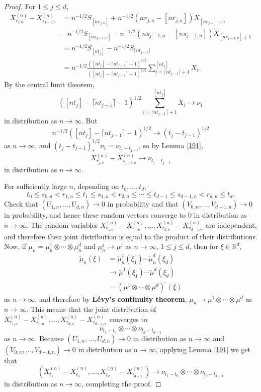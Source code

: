 \documentclass{article}
\theoremstyle{definition}
\begin{document}
\begin{proof}
For $1 \leq j \leq d$, 
\begin{align*}
X^{(n)}_{r_{j,n}} - X^{(n)}_{s_{j-1,n}} &= n^{-1/2} S_{[nr_{j,n}]} + n^{-1/2} (nr_{j,n} - [nr_{j,n}]) X_{[nr_{j,n}]+1}\\
&-n^{-1/2} S_{[ns_{j-1,n}]} - n^{-1/2} (ns_{j-1,n} - [ns_{j-1,n}]) X_{[ns_{j-1,n}]+1}\\
&=n^{-1/2} S_{[nt_j]} - n^{-1/2} S_{\lceil nt_{j-1} \rceil}\\
&=n^{-1/2} \frac{([nt_j] - \lceil nt_{j-1} \rceil - 1)^{1/2}}{([nt_j] - \lceil nt_{j-1} \rceil - 1)^{1/2}} \sum_{i=\lceil nt_{j-1} \rceil+1}^{[nt_j]} X_i.
\end{align*}
By the central limit theorem,
\[
([nt_j] - \lceil nt_{j-1} \rceil - 1)^{1/2}  \sum_{i=\lceil nt_{j-1} \rceil+1}^{[nt_j]} X_i \to \nu_1
\]
in distribution as $n \to \infty$.
But
\[
n^{-1/2} ([nt_j] - \lceil nt_{j-1} \rceil - 1)^{1/2} \to (t_j-t_{j-1})^{1/2}
\]
as $n \to \infty$, and $(t_j-t_{j-1})^{1/2}_* \nu_1 = \nu_{t_j-t_{j-1}}$, 
so by Lemma \ref{191},
\[
X^{(n)}_{r_{j,n}} - X^{(n)}_{s_{j-1,n}}  \to  \nu_{t_j-t_{j-1}}
\]
in distribution as $n \to \infty$. 


For sufficiently large $n$, depending on $t_0,\ldots,t_d$, 
\[
t_0 \leq s_{0,n} < r_{1,n} \leq t_1 \leq s_{1,n} < r_{2,n} \leq \cdots \leq t_{d-1} \leq s_{d-1,n}
<r_{d,n} \leq t_d.
\]
Check that $(U_{1,n},\ldots,U_{d,n}) \to 0$ in probability and that $(V_{0,n},\ldots,V_{d-1,n}) \to 0$ in probability, and hence
these random vectors converge  to $0$ in distribution as $n \to \infty$. 
The random variables $X^{(n)}_{r_{1,n}}-X^{(n)}_{s_{0,n}},
\ldots,X^{(n)}_{r_{d,n}}-X^{(n)}_{s_{d-1,n}}$ are independent,  and therefore their joint distribution is equal to the product of their
distributions. 
Now, if $\mu_n = \mu_n^1 \otimes \cdots \otimes \mu_n^d$ and $\mu_n^j \to \mu^j$ as $n \to \infty$, $1 \leq j \leq d$, then for $\xi \in \mathbb{R}^d$,
\begin{align*}
\widetilde{\mu}_n(\xi)&=\widetilde{\mu}_n^1(\xi_1) \cdots \widetilde{\mu}_n^d(\xi_d)\\
&\to \widetilde{\mu}^1(\xi_1) \cdots \widetilde{\mu}^d(\xi_d)\\
&=(\mu^1 \otimes \cdots \otimes \mu^d)^{\widetilde{\;}}(\xi)
\end{align*}
as $n \to \infty$, and therefore by \textbf{L\'evy's continuity theorem},
$\mu_n \to \mu^1 \otimes \cdots \otimes \mu^d$ as
$n \to \infty$.
This means that the joint distribution of $X^{(n)}_{r_{1,n}}-X^{(n)}_{s_{0,n}},
\ldots,X^{(n)}_{r_{d,n}}-X^{(n)}_{s_{d-1,n}}$ converges  to
\[
\nu_{t_1-t_0} \otimes \cdots \otimes \nu_{t_d-t_{d-1}}
\]
as $n \to \infty$. 
Because $(U_{1,n},\ldots,U_{d,n}) \to 0$ in distribution as $n \to \infty$ and $(V_{0,n},\ldots,V_{d-1,n}) \to 0$ in distribution as $n \to \infty$,
applying Lemma \ref{191} we get that 
\[
(X^{(n)}_{t_1} - X^{(n)}_{t_{0}},
\ldots,X^{(n)}_{t_d} - X^{(n)}_{t_{d-1}}) \to \nu_{t_1-t_0} \otimes \cdots \otimes \nu_{t_d-t_{d-1}}
\]
in distribution as $n \to \infty$, completing the proof.
\end{proof}
\end{document}
